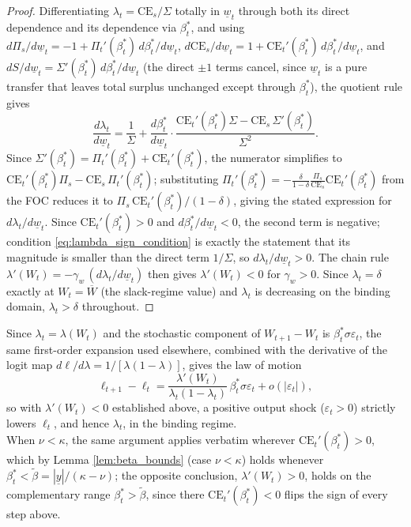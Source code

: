 \documentclass{article}
\theoremstyle{definition}
\theoremstyle{plain}
\begin{document}
\begin{appendices}
\begin{proof}
Differentiating $\lambda_t=\text{CE}_s/\Sigma$ totally in $\underline w_t$ through both its direct dependence and its dependence via $\beta_t^*$, and using $d\Pi_s/d\underline w_t=-1+\Pi_t'(\beta_t^*)\,d\beta_t^*/d\underline w_t$, $d\text{CE}_s/d\underline w_t=1+\text{CE}_t'(\beta_t^*)\,d\beta_t^*/d\underline w_t$, and $dS/d\underline w_t=\Sigma'(\beta_t^*)\,d\beta_t^*/d\underline w_t$ (the direct $\pm1$ terms cancel, since $\underline w_t$ is a pure transfer that leaves total surplus unchanged except through $\beta_t^*$), the quotient rule gives
\[
\frac{d\lambda_t}{d\underline w_t}=\frac{1}{\Sigma}+\frac{d\beta_t^*}{d\underline w_t}\cdot\frac{\text{CE}_t'(\beta_t^*)\Sigma-\text{CE}_s\,\Sigma'(\beta_t^*)}{\Sigma^2}.
\]
Since $\Sigma'(\beta_t^*)=\Pi_t'(\beta_t^*)+\text{CE}_t'(\beta_t^*)$, the numerator simplifies to $\text{CE}_t'(\beta_t^*)\Pi_s-\text{CE}_s\,\Pi_t'(\beta_t^*)$; substituting $\Pi_t'(\beta_t^*)=-\frac{\delta}{1-\delta}\frac{\Pi_s}{\text{CE}_s}\text{CE}_t'(\beta_t^*)$ from the FOC reduces it to $\Pi_s\,\text{CE}_t'(\beta_t^*)/(1-\delta)$, giving the stated expression for $d\lambda_t/d\underline w_t$. Since $\text{CE}_t'(\beta_t^*)>0$ and $d\beta_t^*/d\underline w_t<0$, the second term is negative; condition \eqref{eq:lambda_sign_condition} is exactly the statement that its magnitude is smaller than the direct term $1/\Sigma$, so $d\lambda_t/d\underline w_t>0$. The chain rule $\lambda'(W_t)=-\gamma_w\,(d\lambda_t/d\underline w_t)$ then gives $\lambda'(W_t)<0$ for $\gamma_w>0$. Since $\lambda_t=\delta$ exactly at $W_t=\overline W$ (the slack-regime value) and $\lambda_t$ is decreasing on the binding domain, $\lambda_t>\delta$ throughout.
\end{proof}
Since $\lambda_t=\lambda(W_t)$ and the stochastic component of $W_{t+1}-W_t$ is $\beta_t^*\sigma\varepsilon_t$, the same first-order expansion used elsewhere, combined with the derivative of the logit map $d\ell/d\lambda=1/[\lambda(1-\lambda)]$, gives the law of motion
\[
\ell_{t+1}-\ell_t=\frac{\lambda'(W_t)}{\lambda_t(1-\lambda_t)}\,\beta_t^*\sigma\varepsilon_t+o(|\varepsilon_t|),
\]
so with $\lambda'(W_t)<0$ established above, a positive output shock ($\varepsilon_t>0$) strictly lowers $\ell_t$, and hence $\lambda_t$, in the binding regime.\\
When $\nu<\kappa$, the same argument applies verbatim wherever $\text{CE}_t'(\beta_t^*)>0$, which by Lemma \ref{lem:beta_bounds} (case $\nu<\kappa$) holds whenever $\beta_t^*<\tilde\beta=|\underline y|/(\kappa-\nu)$; the opposite conclusion, $\lambda'(W_t)>0$, holds on the complementary range $\beta_t^*>\tilde\beta$, since there $\text{CE}_t'(\beta_t^*)<0$ flips the sign of every step above.


\end{appendices}
\end{document}
